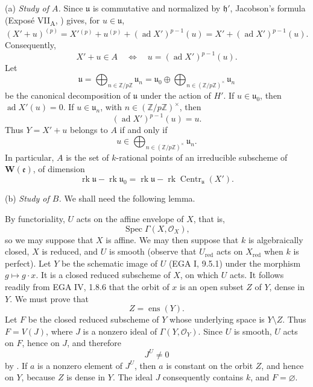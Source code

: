 \smallskip
\noindent
(a) \emph{Study of \(A\).}
Since \(\mathfrak u\) is commutative and normalized by
\(\mathfrak h'\), Jacobson's formula (Exposé VII\textsubscript{A},
) gives, for \(u\in\mathfrak u\),
\[
  (X'+u)^{(p)}
   =X'{}^{(p)}+u^{(p)}
      +(\operatorname{ad}X')^{p-1}(u)
   =X'+(\operatorname{ad}X')^{p-1}(u).
\]
Consequently,
\[
  X'+u\in A
  \quad\Longleftrightarrow\quad
  u=(\operatorname{ad}X')^{p-1}(u).
\]
Let
\[
  \mathfrak u
   =\bigoplus_{n\in\mathbb Z/p\mathbb Z}\mathfrak u_n
   =\mathfrak u_0\oplus
      \bigoplus_{n\in(\mathbb Z/p\mathbb Z)^\times}\mathfrak u_n
\]
be the canonical decomposition of \(\mathfrak u\) under the action
of \(H'\).  If \(u\in\mathfrak u_0\), then
\(\operatorname{ad}X'(u)=0\).  If
\(u\in\mathfrak u_n\), with
\(n\in(\mathbb Z/p\mathbb Z)^\times\), then
\[
  (\operatorname{ad}X')^{p-1}(u)=u.
\]
Thus \(Y=X'+u\) belongs to \(A\) if and only if
\[
  u\in
  \bigoplus_{n\in(\mathbb Z/p\mathbb Z)^\times}\mathfrak u_n.
\]
In particular, \(A\) is the set of \(k\)-rational points of an
irreducible subscheme of \(\mathbf W(\mathfrak e)\), of dimension
\[
  \operatorname{rk}\mathfrak u-\operatorname{rk}\mathfrak u_0
  =
  \operatorname{rk}\mathfrak u
  -\operatorname{rk}\operatorname{Centr}_{\mathfrak u}(X').
\]

\smallskip
\noindent
(b) \emph{Study of \(B\).}
We shall need the following lemma.


By functoriality, \(U\) acts on the affine envelope of \(X\), that
is,
\[
  \operatorname{Spec}\Gamma(X,\mathcal O_X),
\]
so we may suppose that \(X\) is affine.  We may then suppose that
\(k\) is algebraically closed, \(X\) is reduced, and \(U\) is smooth
(observe that \(U_{\mathrm{red}}\) acts on \(X_{\mathrm{red}}\) when
\(k\) is perfect).  Let \(Y\) be the schematic image of \(U\)
(EGA I, 9.5.1) under the morphism \(g\mapsto g\cdot x\).  It is a
closed reduced subscheme of \(X\), on which \(U\) acts.  It follows
readily from EGA IV, 1.8.6 that the orbit of \(x\) is an open subset
\(Z\) of \(Y\), dense in \(Y\).  We must prove that
\[
  Z=\operatorname{ens}(Y).
\]
Let \(F\) be the closed reduced subscheme of \(Y\) whose underlying
space is \(Y\setminus Z\).  Thus \(F=V(J)\), where \(J\) is a
nonzero ideal of \(\Gamma(Y,\mathcal O_Y)\).  Since \(U\) is smooth,
\(U\) acts on \(F\), hence on \(J\), and therefore
\[
  J^U\ne0
\]
by .  If \(a\) is a nonzero element of \(J^U\), then \(a\) is
constant on the orbit \(Z\), and hence on \(Y\), because \(Z\) is
dense in \(Y\).  The ideal \(J\) consequently contains \(k\), and
\(F=\varnothing\).

